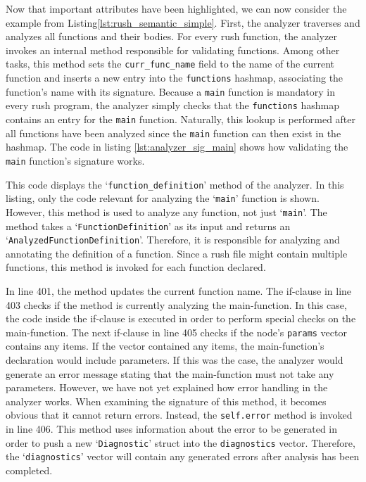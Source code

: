 Now that important attributes have been highlighted, we can now consider the example from Listing\ref{lst:rush_semantic_simple}.
First, the analyzer traverses and analyzes all functions and their bodies.
For every rush function, the analyzer invokes an internal method responsible for validating functions.
Among other tasks, this method sets the \texttt{curr\_func\_name} field to the name of the current function and
inserts a new entry into the \texttt{functions} hashmap, associating the function's name with its signature.
Because a \texttt{main} function is mandatory in every rush program,
the analyzer simply checks that the \texttt{functions} hashmap contains an entry for the \texttt{main} function.
Naturally, this lookup is performed after all functions have been analyzed since the \texttt{main} function can then exist in the hashmap.
The code in listing \ref{lst:analyzer_sig_main} shows how validating the \texttt{main} function's signature works.


This code displays the `\texttt{function\_definition}' method of the analyzer.
In this listing, only the code relevant for analyzing the `\texttt{main}' function is shown.
However, this method is used to analyze any function, not just `\texttt{main}'.
The method  takes a `\texttt{FunctionDefinition}' as its input and returns an `\texttt{AnalyzedFunctionDefinition}'.
Therefore, it is responsible for analyzing and annotating the definition of a function.
Since a rush file might contain multiple functions, this method is invoked for each function declared.

In line 401, the method updates the current function name.
The if-clause in line 403 checks if the method is currently analyzing the main-function.
In this case, the code inside the if-clause is executed in order to perform special checks on the main-function.
The next if-clause in line 405 checks if the node's \texttt{params} vector contains any items.
If the vector contained any items, the main-function's declaration would include parameters.
If this was the case, the analyzer would generate an error message stating that the main-function must not take any parameters.
However, we have not yet explained how error handling in the analyzer works.
When examining the signature of this method, it becomes obvious that it cannot return errors.
Instead, the \texttt{self.error} method is invoked in line 406.
This method uses information about the error to be generated in order to push a new `\texttt{Diagnostic}' struct into the \texttt{diagnostics} vector.
Therefore, the `\texttt{diagnostics}' vector will contain any generated errors after analysis has been completed.

